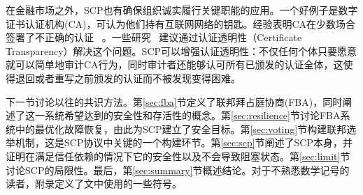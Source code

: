 在金融市场之外，SCP也有确保组织诚实履行关键职能的应用。一个好例子是数字证书认证机构(CA)，可认为他们持有互联网网络的钥匙。经验表明CA在少数场合签署了不正确的认证~\cite{ac_ms2013,dc_google2015} 。一些研究~\cite{Kim:2013up,ct_google2013,Basin:2014bn,cryptoeprint:2014:1004} 建议通过认证透明性（Certificate Transparency）解决这个问题。SCP可以增强认证透明性：不仅任何个体只要愿意就可以简单地审计CA行为，同时审计者还能够认可所有已颁发的认证全体，这使得退回或者重写之前颁发的认证而不被发现变得困难。

下一节讨论以往的共识方法。第\ref{sec:fba}节定义了联邦拜占庭协商(FBA)，同时阐述了这一系统希望达到的安全性和存活性的概念。第\ref{sec:resilience}节讨论FBA系统中的最优化故障恢复，由此为SCP建立了安全目标。第\ref{sec:voting}节构建联邦选举机制，这是SCP协议中关键的一个构建环节。第\ref{sec:scp}节阐述了SCP本身，并证明在满足信任依赖的情况下它的安全性以及不会导致阻塞状态。第\ref{sec:limit}节讨论SCP的局限性。最后，第\ref{sec:summary}节概述结论。对于不熟悉数学记号的读者，附录定义了文中使用的一些符号。